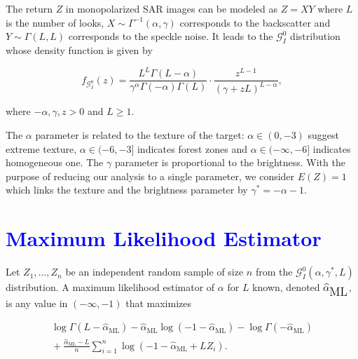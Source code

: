 \documentclass[a0,portrait]{a0poster}
\begin{document}
\begin{multicols}{3}
The return $Z$ in monopolarized SAR images can be modeled as $Z=X Y$  where $L$ is the number of looks, $X \sim \Gamma^{-1}(\alpha ,\gamma)$ corresponds to the backscatter and $Y \sim \Gamma(L,L)$ corresponds to the speckle noise. It leads to the $\mathcal{G}_I^{0}$ distribution whose density function is given by

{\small
\begin{equation*}
f_{\mathcal{G}_I^{0}}( z) =\frac{L^{L}\Gamma ( L-\alpha
	) }{\gamma ^{\alpha }\Gamma ( -\alpha ) \Gamma (
	L) }\cdot  
\frac{z^{L-1}}{( \gamma +zL) ^{L-\alpha }},%
\label{ec_dens_gI0}
\end{equation*}
}

where $-\alpha,\gamma ,z>0$ and $L\geq 1$. 

\vspace{0.54cm}
The $\alpha$ parameter is related to the texture of the target: $\alpha \in (0,-3)$ suggest extreme texture,  $\alpha \in (-6,-3]$ indicates forest zones and $\alpha\in(-\infty,-6]$ indicates homogeneous one.
The $\gamma$ parameter is proportional to the brightness.
With the purpose of reducing our analysis to a single parameter, we consider $E(Z)=1$ which links the texture and the brightness parameter by $\gamma^* =-\alpha-1$.


\section*{\textcolor{blue}{Maximum Likelihood Estimator }}
Let $Z_1,\dots, Z_n$ be an independent random sample of size $n$ from the $\mathcal G_I^0(\alpha,\gamma^*,L)$ distribution.
A maximum likelihood estimator of $\alpha$ for $L$ known, denoted $\widehat\alpha_{\text{\tiny{ML}}}$, is any value in $(-\infty,-1)$ that maximizes

{\small
\begin{align*}
\log \Gamma(L-\widehat\alpha_{\text{ML}})-
\widehat\alpha_{\text{ML}}\log(-1-\widehat\alpha_{\text{ML}})
-\log\Gamma(-\widehat\alpha_{\text{ML}}) \nonumber \\
\mbox{}+\frac{\widehat\alpha_{\text{ML}}-L}{n} \sum_{i=1}^n\log(-1-\widehat\alpha_{\text{ML}}+L Z_i).
\label{ML}
\end{align*}
}



\end{multicols}
\end{document}
